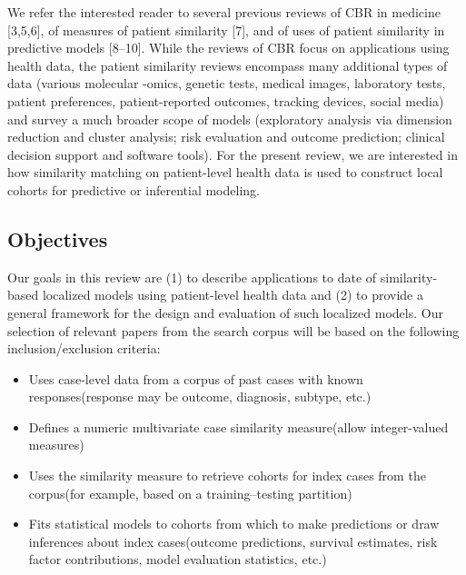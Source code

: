 \documentclass[preprint, 3p,
authoryear]{elsarticle} %
\providecommand{\tightlist}{%
  \setlength{\itemsep}{0pt}\setlength{\parskip}{0pt}}
\begin{document}
We refer the interested reader to several previous reviews of CBR in
medicine {[}3,5,6{]}, of measures of patient similarity {[}7{]}, and of
uses of patient similarity in predictive models {[}8--10{]}. While the
reviews of CBR focus on applications using health data, the patient
similarity reviews encompass many additional types of data (various
molecular -omics, genetic tests, medical images, laboratory tests,
patient preferences, patient-reported outcomes, tracking devices, social
media) and survey a much broader scope of models (exploratory analysis
via dimension reduction and cluster analysis; risk evaluation and
outcome prediction; clinical decision support and software tools). For
the present review, we are interested in how similarity matching on
patient-level health data is used to construct local cohorts for
predictive or inferential modeling.

\hypertarget{objectives}{%
\subsection{Objectives}\label{objectives}}

Our goals in this review are (1) to describe applications to date of
similarity-based localized models using patient-level health data and
(2) to provide a general framework for the design and evaluation of such
localized models. Our selection of relevant papers from the search
corpus will be based on the following inclusion/exclusion criteria:

\begin{itemize}
\tightlist
\item
  Uses case-level data from a corpus of past cases with known
  responses\newline (response may be outcome, diagnosis, subtype, etc.)
\item
  Defines a numeric multivariate case similarity measure\newline (allow
  integer-valued measures)
\item
  Uses the similarity measure to retrieve cohorts for index cases from
  the corpus\newline (for example, based on a training--testing
  partition)
\item
  Fits statistical models to cohorts from which to make predictions or
  draw inferences about index cases\newline (outcome predictions,
  survival estimates, risk factor contributions, model evaluation
  statistics, etc.)
\end{itemize}
\end{document}

